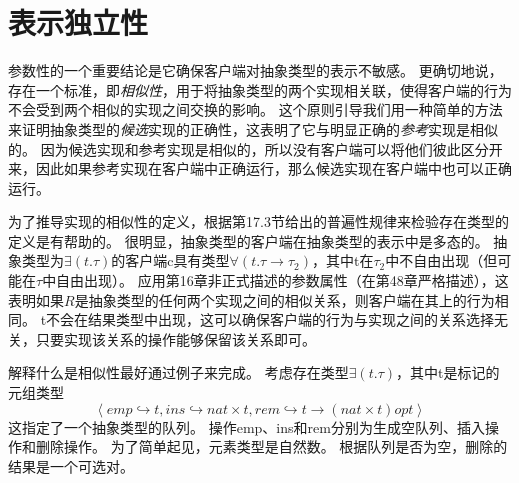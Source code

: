 ﻿\section{表示独立性}

参数性的一个重要结论是它确保客户端对抽象类型的表示不敏感。
更确切地说，存在一个标准，即\textit{相似性}，用于将抽象类型的两个实现相关联，使得客户端的行为不会受到两个相似的实现之间交换的影响。 这个原则引导我们用一种简单的方法来证明抽象类型的\textit{候选}实现的正确性，这表明了它与明显正确的\textit{参考}实现是相似的。 因为候选实现和参考实现是相似的，所以没有客户端可以将他们彼此区分开来，因此如果参考实现在客户端中正确运行，那么候选实现在客户端中也可以正确运行。

为了推导实现的相似性的定义，根据第17.3节给出的普遍性规律来检验存在类型的定义是有帮助的。
很明显，抽象类型的客户端在抽象类型的表示中是多态的。
抽象类型为$\exists(t.\tau)$的客户端c具有类型$\forall(t.\tau \rightarrow \tau_{2})$，其中t在$\tau_{2}$中不自由出现（但可能在$\tau$中自由出现）。 应用第16章非正式描述的参数属性（在第48章严格描述），这表明如果$R$是抽象类型的任何两个实现之间的相似关系，则客户端在其上的行为相同。 t不会在结果类型中出现，这可以确保客户端的行为与实现之间的关系选择无关，只要实现该关系的操作能够保留该关系即可。

解释什么是相似性最好通过例子来完成。
考虑存在类型$\exists(t.\tau)$，其中t是标记的元组类型
$$\left \langle emp \hookrightarrow t,ins \hookrightarrow nat \times t,rem \hookrightarrow t \rightarrow (nat \times t)opt \right \rangle$$
这指定了一个抽象类型的队列。
操作emp、ins和rem分别为生成空队列、插入操作和删除操作。
为了简单起见，元素类型是自然数。
根据队列是否为空，删除的结果是一个可选对。

